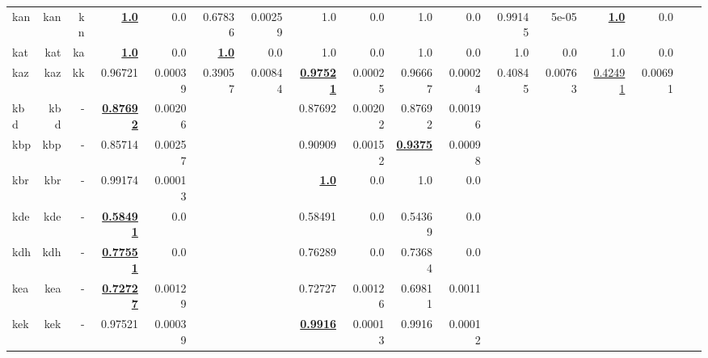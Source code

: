 \documentclass[11pt]{article}
\begin{document}
\begin{table*}[h]
{\begin{tabular}{lrrrrrrrrrrrrrrrr}
kan         & kan         & kn         & \textbf{\underline{1.0}}         & 0.0         & 0.67836         & 0.00259         & 1.0         & 0.0         & 1.0         & 0.0         & 0.99145         & 5e-05         & \textbf{\underline{1.0}}         & 0.0         \\
kat         & kat         & ka         & \textbf{\underline{1.0}}         & 0.0         & \textbf{\underline{1.0}}         & 0.0         & 1.0         & 0.0         & 1.0         & 0.0         & 1.0         & 0.0         & 1.0         & 0.0         \\
kaz         & kaz         & kk         & 0.96721         & 0.00039         & 0.39057         & 0.00844         & \textbf{\underline{0.97521}}         & 0.00025         & 0.96667         & 0.00024         & 0.40845         & 0.00763         & \underline{0.42491}         & 0.00691         \\
kbd         & kbd         & -         & \textbf{\underline{0.87692}}         & 0.00206         &          &          & 0.87692         & 0.00202         & 0.87692         & 0.00196         &          &          &          &          \\
kbp         & kbp         & -         & 0.85714         & 0.00257         &          &          & 0.90909         & 0.00152         & \textbf{\underline{0.9375}}         & 0.00098         &          &          &          &          \\
kbr         & kbr         & -         & 0.99174         & 0.00013         &          &          & \textbf{\underline{1.0}}         & 0.0         & 1.0         & 0.0         &          &          &          &          \\
kde         & kde         & -         & \textbf{\underline{0.58491}}         & 0.0         &          &          & 0.58491         & 0.0         & 0.54369         & 0.0         &          &          &          &          \\
kdh         & kdh         & -         & \textbf{\underline{0.77551}}         & 0.0         &          &          & 0.76289         & 0.0         & 0.73684         & 0.0         &          &          &          &          \\
kea         & kea         & -         & \textbf{\underline{0.72727}}         & 0.00129         &          &          & 0.72727         & 0.00126         & 0.69811         & 0.0011         &          &          &          &          \\
kek         & kek         & -         & 0.97521         & 0.00039         &          &          & \textbf{\underline{0.9916}}         & 0.00013         & 0.9916         & 0.00012         &          &          &          &          \\

\end{tabular}}
\end{table*}
\end{document}
